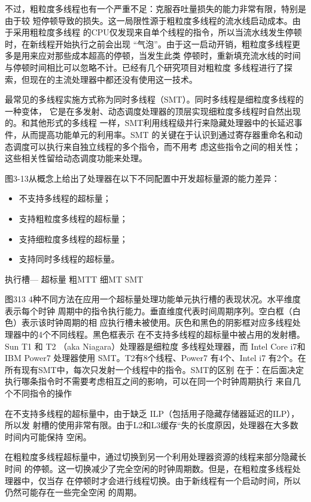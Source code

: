 不过，粗粒度多线程也有一个严重不足：克服吞吐量损失的能力非常有限，特别是由于较
短停顿导致的损失。这一局限性源于粗粒度多线程的流水线启动成本。由于采用粗粒度多线程
的CPU仅发现来自单个线程的指令，所以当流水线发生停顿时，在新线程开始执行之前会出现
“气泡”。由于这一启动开销，粗粒度多线程更多是用来应对那些成本超高的停顿，当发生此类
停顿时，重新填充流水线的时间与停顿时间相比可以忽略不计。已经有几个研究项目对粗粒度
多线程进行了探索，但现在的主流处理器中都还没有使用这一技术。

最常见的多线程实施方式称为同时多线程（SMT）。同时多线程是细粒度多线程的一种变体，
它是在多发射、动态调度处理器的顶层实现细粒度多线程时自然出现的。和其他形式的多线程
一样，SMT利用线程级并行来隐藏处理器中的长延迟事件，从而提高功能单元的利用率。SMT
的关键在于认识到通过寄存器重命名和动态调度可以执行来自独立线程的多个指令，而不用考
虑这些指令之间的相关性；这些相关性留给动态调度功能来处理。

图3-13从概念上给出了处理器在以下不同配置中开发超标量源的能力差异：
\begin{itemize}
    \item 不支持多线程的超标量；
    \item 支持粗粒度多线程的超标量；
    \item 支持细粒度多线程的超标量；
    \item 支持同时多线程的超标量。
\end{itemize}

执行槽—
超标量
粗MTT
细MT
SMT

图313 4种不同方法在应用一个超标量处理功能单元执行槽的表现状况。水平维度表示每个时钟
周期中的指令执行能力。垂直维度代表时间周期序列。空白框（白色）表示该时钟周期的相
应执行槽未被使用。灰色和黑色的阴影框对应多线程处理器中的4个不同线程。黑色框表示
在不支持多线程的超标量中被占用的发射槽。Sun T1 和 T2 （aka Niagara）处理器是细粒度
多线程处理器，而 Intel Core i7和 IBM Power7 处理器使用 SMT。T2有8个线程、Power7
有4个、Intel i7 有2个。在所有现有SMT中，每次只发射一个线程中的指令。SMT的区别
在于：在后面决定执行哪条指令时不需要考虑相互之间的影响，可以在同一个时钟周期执行
来自几个不同指令的操作

在不支持多线程的超标量中，由于缺乏 ILP（包括用子隐藏存储器延迟的ILP），所以发
射槽的使用非常有限。由于L2和L3缓存“失的长度原因，处理器在大多数时间内可能保持
空闲。

在粗粒度多线程超标量中，通过切换到另一个利用处理器资源的线程来部分隐藏长时间
的停顿。这一切换减少了完全空闲的时钟周期数。但是，在粗粒度多线程处理器中，仅当存
在停顿时才会进行线程切换。由于新线程有一个启动时间，所以仍然可能存在一些完全空闲
的周期。

